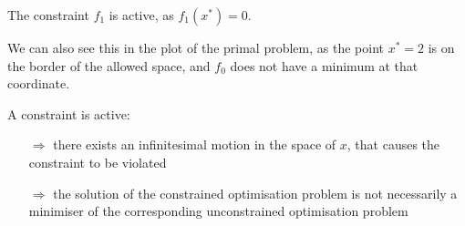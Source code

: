 The constraint $f_1$ is active, as $f_1(x^*) = 0$.

We can also see this in the plot of the primal problem, as the point $x^*=2$ is on the border of the allowed space, and $f_0$ does not have a minimum at that coordinate.

A constraint is active:
\begin{itemize}
\item[$\Rightarrow$]{there exists an infinitesimal motion in the space of $x$, that causes the constraint to be violated}
\item[$\Rightarrow$]{the solution of the constrained optimisation problem is not necessarily a minimiser of the corresponding unconstrained optimisation problem}
\end{itemize}

